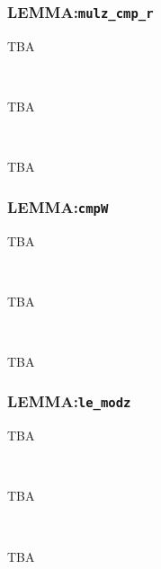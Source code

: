 \subsubsection*{LEMMA:\quad \texttt{mulz\_cmp\_r}}
\begin{statement}
	TBA
\end{statement}
\ \\
\begin{analysis}
	TBA
\end{analysis}
\ \\
\begin{pftactics}
	TBA
\end{pftactics}

\subsubsection*{LEMMA:\quad \texttt{cmpW}}
\begin{statement}
	TBA
\end{statement}
\ \\
\begin{analysis}
	TBA
\end{analysis}
\ \\
\begin{pftactics}
	TBA
\end{pftactics}

\subsubsection*{LEMMA:\quad \texttt{le\_modz}}
\begin{statement}
	TBA
\end{statement}
\ \\
\begin{analysis}
	TBA
\end{analysis}
\ \\
\begin{pftactics}
	TBA
\end{pftactics}